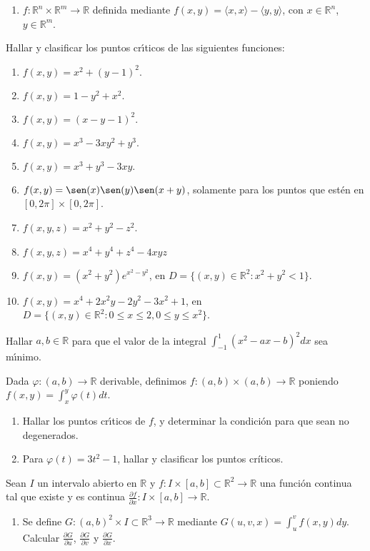 \documentclass[11pt]{article}
\newcommand{\R}{\mathbb{R}}
\newcommand{\be}{\begin{enumerate}}
\newcommand{\ee}{\end{enumerate}}
\begin{document}
\begin{enumerate}
\item $f:\R^n\times \R^m \to \R$ definida mediante  
  $f(x,y) = \langle x,x\rangle - \langle y,y\rangle$, con $x\in \R^n$, $y \in \R^m$.
  
  
  \ee
\item Hallar y clasificar los puntos cr\'\i ticos de las siguientes 
  funciones:
  \be \item $f(x,y) = x^2 + (y-1)^2.$ 
      \item $f(x,y) = 1 - y^2 +x^2.$ 
      \item $f(x,y) = (x-y-1)^2.$ 
      \item $f(x,y) = x^3 - 3xy^2 + y^3.$ 
      \item $f(x,y) = x^3 + y^3 -3xy.$ 
      \item $f(x,y) = \sen(x)\sen(y)\sen(x+y)$, solamente para los puntos que est\'en en $[0,2\pi]\times
        [0,2\pi]$. 
      \item $f(x,y,z)=x^2+y^2-z^2$.
      \item $f(x,y,z) = x^4 + y^4 + z^4 - 4xyz$
      \item $f(x,y)=(x^2 + y^2)e^{x^2-y^2}$, en $D=\{ (x,y) \in \R^2 : x^2+y^2 < 1 \}$.
\item $f(x,y)=x^4+2x^2y-2y^2-3x^2+1$, en $D=\{(x,y) \in \R^2 : 0\leq x \leq 2, 0 \leq y \leq x^2 \}$.
  \ee
  


\item  Hallar $a,b\in \R$  para que el valor de la integral
$\int_{-1}^{1}(x^2-ax-b)^2dx$ sea m\'\i nimo.

\item Dada $\varphi:(a,b)\to\R$ derivable, definimos
  $f:(a,b)\times(a,b)\to\R$ poniendo
  $f(x,y)=\int_x^y\varphi(t)dt$. 
\begin{enumerate}
\item Hallar los puntos cr\'\i ticos de
  $f$, y determinar la condici\'on para que sean no degenerados.
  \item Para $\varphi(t)=3t^2-1$, hallar y clasificar los puntos cr\'iticos.
\end{enumerate}  
   


\item Sean $I$ un intervalo abierto en $\R$ y $f:I\times[a,b]\subset 
  \R^2 \to \R$ una funci\'on continua tal que existe y es continua 
  $\frac{\partial f}{\partial x}:I\times [a,b]\to \R$.
  \be
   \item Se define $G: (a,b)^2\times I \subset \R^3 \to \R$
     mediante $G(u,v,x) = \int_u^vf(x,y)dy$. Calcular $\frac{\partial
       G}{\partial u}$, $\frac{\partial G}{\partial v}$ y
     $\frac{\partial G}{\partial x}$.


\end{enumerate}
\end{document}
